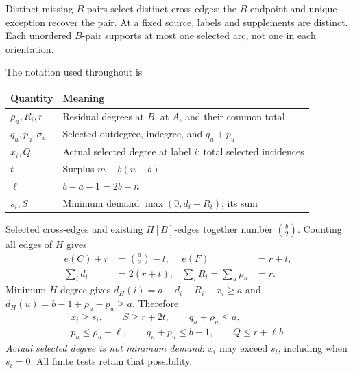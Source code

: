 \documentclass[11pt,a4paper]{article}
\begin{document}
Distinct missing $B$-pairs select distinct cross-edges: the $B$-endpoint and unique exception recover the pair. At a fixed source, labels and supplements are distinct. Each unordered $B$-pair supports at most one selected arc, not one in each orientation.

The notation used throughout is
\begin{center}\begin{tabular}{ll}\toprule
Quantity & Meaning\\\midrule
$\rho_u,R_i,r$ & Residual degrees at $B$, at $A$, and their common total\\
$q_u,p_u,\sigma_u$ & Selected outdegree, indegree, and $q_u+p_u$\\
$x_i,Q$ & Actual selected degree at label $i$; total selected incidences\\
$t$ & Surplus $m-b(n-b)$\\
$\ell$ & $b-a-1=2b-n$\\
$s_i,S$ & Minimum demand $\max(0,d_i-R_i)$; its sum\\\bottomrule
\end{tabular}\end{center}
Selected cross-edges and existing $H[B]$-edges together number $\binom b2$. Counting all edges of $H$ gives
\begin{align}
 e(C)+r&=\binom a2-t,& e(F)&=r+t,\label{eq:ledger}\\
 \sum_i d_i&=2(r+t),&\sum_iR_i=\sum_u\rho_u&=r.\nonumber
\end{align}
Minimum $H$-degree gives $d_H(i)=a-d_i+R_i+x_i\ge a$ and
$d_H(u)=b-1+\rho_u-p_u\ge a$. Therefore
\begin{gather}
 x_i\ge s_i,\qquad S\ge r+2t,\qquad q_u+\rho_u\le a,\label{eq:basic}\\
 p_u\le\rho_u+\ell,\qquad q_u+p_u\le b-1,\qquad Q\le r+\ell b.\nonumber
\end{gather}
\emph{Actual selected degree is not minimum demand}: $x_i$ may exceed $s_i$, including when $s_i=0$. All finite tests retain that possibility.
\end{document}
